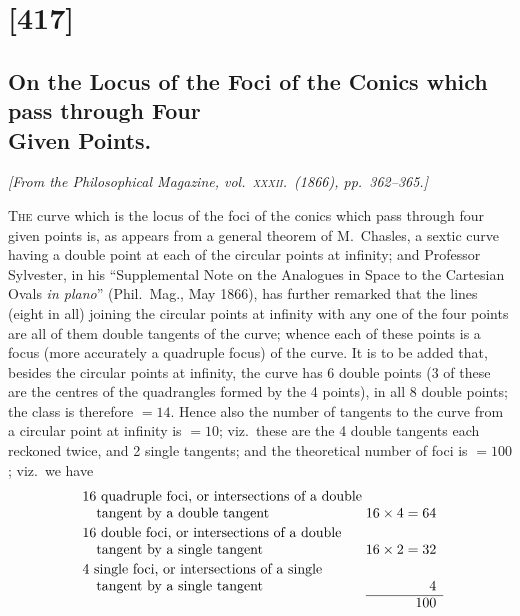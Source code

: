 \documentclass[11pt,a4paper]{article}
\begin{document}
\clearpage

\tableofcontents
\clearpage

\section*{[417]}
\subsection*{On the Locus of the Foci of the Conics which pass through Four\\
Given Points.}

\begin{center}
\textit{[From the Philosophical Magazine, vol.~\textsc{xxxii}.\ (1866), pp.~362--365.]}
\end{center}

\textsc{The} curve which is the locus of the foci of the conics which pass through
four given points is, as appears from a general theorem of M.~Chasles, a sextic
curve having a double point at each of the circular points at infinity; and
Professor Sylvester, in his ``Supplemental Note on the Analogues in Space to
the Cartesian Ovals \textit{in plano}'' (Phil.\ Mag., May 1866), has further
remarked that the lines (eight in all) joining the circular points at infinity
with any one of the four points are all of them double tangents of the curve;
whence each of these points is a focus (more accurately a quadruple focus) of
the curve.  It is to be added that, besides the circular points at infinity,
the curve has 6 double points (3 of these are the centres of the quadrangles
formed by the 4 points), in all 8 double points; the class is therefore $=14$.
Hence also the number of tangents to the curve from a circular point at
infinity is $=10$; viz.\ these are the 4 double tangents each reckoned twice,
and 2 single tangents; and the theoretical number of foci is $=100$; viz.\ we
have
\[
\begin{array}{l@{\;}r}
\text{16 quadruple foci, or intersections of a double} \\
\text{\quad tangent by a double tangent} & 16 \times 4 = 64 \\[2pt]
\text{16 double foci, or intersections of a double} \\
\text{\quad tangent by a single tangent} & 16 \times 2 = 32 \\[2pt]
\text{4 single foci, or intersections of a single} \\
\text{\quad tangent by a single tangent} & \phantom{16 \times 2 = {}} 4 \\
\cline{2-2}
& 100
\end{array}
\]
\end{document}
